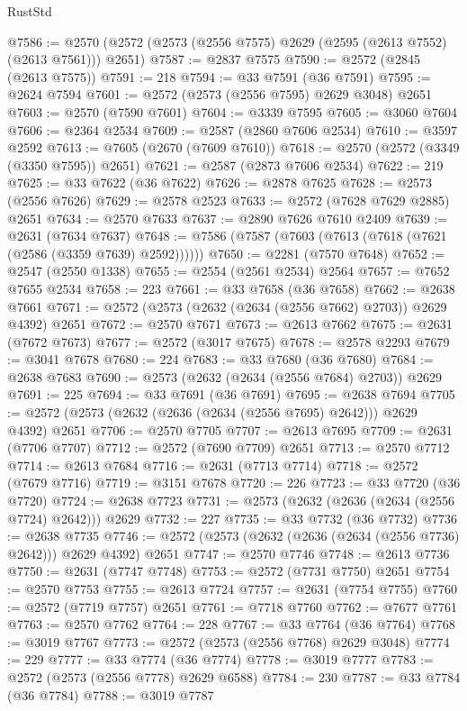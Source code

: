 \begin{lexlean}{RustStd}
\begin{coremodule}
@7586 := @2570 (@2572 (@2573 (@2556 @7575) @2629 (@2595 (@2613 @7552) (@2613 @7561))) @2651)
@7587 := @2837 @7575
@7590 := @2572 (@2845 (@2613 @7575))
@7591 := 218
@7594 := @33 @7591 (@36 @7591)
@7595 := @2624 @7594
@7601 := @2572 (@2573 (@2556 @7595) @2629 @3048) @2651
@7603 := @2570 (@7590 @7601)
@7604 := @3339 @7595
@7605 := @3060 @7604
@7606 := @2364 @2534
@7609 := @2587 (@2860 @7606 @2534)
@7610 := @3597 @2592
@7613 := @7605 (@2670 (@7609 @7610))
@7618 := @2570 (@2572 (@3349 (@3350 @7595)) @2651)
@7621 := @2587 (@2873 @7606 @2534)
@7622 := 219
@7625 := @33 @7622 (@36 @7622)
@7626 := @2878 @7625
@7628 := @2573 (@2556 @7626)
@7629 := @2578 @2523
@7633 := @2572 (@7628 @7629 @2885) @2651
@7634 := @2570 @7633
@7637 := @2890 @7626 @7610 @2409
@7639 := @2631 (@7634 @7637)
@7648 := @7586 (@7587 (@7603 (@7613 (@7618 (@7621 (@2586 (@3359 @7639) @2592))))))
@7650 := @2281 (@7570 @7648)
@7652 := @2547 (@2550 @1338)
@7655 := @2554 (@2561 @2534) @2564
@7657 := @7652 @7655 @2534
@7658 := 223
@7661 := @33 @7658 (@36 @7658)
@7662 := @2638 @7661
@7671 := @2572 (@2573 (@2632 (@2634 (@2556 @7662) @2703)) @2629 @4392) @2651
@7672 := @2570 @7671
@7673 := @2613 @7662
@7675 := @2631 (@7672 @7673)
@7677 := @2572 (@3017 @7675)
@7678 := @2578 @2293
@7679 := @3041 @7678
@7680 := 224
@7683 := @33 @7680 (@36 @7680)
@7684 := @2638 @7683
@7690 := @2573 (@2632 (@2634 (@2556 @7684) @2703)) @2629
@7691 := 225
@7694 := @33 @7691 (@36 @7691)
@7695 := @2638 @7694
@7705 := @2572 (@2573 (@2632 (@2636 (@2634 (@2556 @7695) @2642))) @2629 @4392) @2651
@7706 := @2570 @7705
@7707 := @2613 @7695
@7709 := @2631 (@7706 @7707)
@7712 := @2572 (@7690 @7709) @2651
@7713 := @2570 @7712
@7714 := @2613 @7684
@7716 := @2631 (@7713 @7714)
@7718 := @2572 (@7679 @7716)
@7719 := @3151 @7678
@7720 := 226
@7723 := @33 @7720 (@36 @7720)
@7724 := @2638 @7723
@7731 := @2573 (@2632 (@2636 (@2634 (@2556 @7724) @2642))) @2629
@7732 := 227
@7735 := @33 @7732 (@36 @7732)
@7736 := @2638 @7735
@7746 := @2572 (@2573 (@2632 (@2636 (@2634 (@2556 @7736) @2642))) @2629 @4392) @2651
@7747 := @2570 @7746
@7748 := @2613 @7736
@7750 := @2631 (@7747 @7748)
@7753 := @2572 (@7731 @7750) @2651
@7754 := @2570 @7753
@7755 := @2613 @7724
@7757 := @2631 (@7754 @7755)
@7760 := @2572 (@7719 @7757) @2651
@7761 := @7718 @7760
@7762 := @7677 @7761
@7763 := @2570 @7762
@7764 := 228
@7767 := @33 @7764 (@36 @7764)
@7768 := @3019 @7767
@7773 := @2572 (@2573 (@2556 @7768) @2629 @3048)
@7774 := 229
@7777 := @33 @7774 (@36 @7774)
@7778 := @3019 @7777
@7783 := @2572 (@2573 (@2556 @7778) @2629 @6588)
@7784 := 230
@7787 := @33 @7784 (@36 @7784)
@7788 := @3019 @7787

\end{coremodule}
\end{lexlean}
